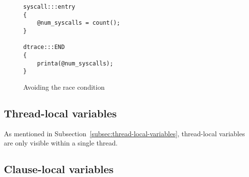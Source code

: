 \begin{figure}
  \begin{lstlisting}
syscall:::entry
{
    @num_syscalls = count();
}

dtrace:::END
{
    printa(@num_syscalls);
}
  \end{lstlisting}
  \caption{Avoiding the race condition}
  \label{fig:avoiding-the-race}
\end{figure}

\subsection{Thread-local variables}

As mentioned in Subsection~\ref{subsec:thread-local-variables}, thread-local
variables are only visible within a single thread.

\subsection{Clause-local variables}
